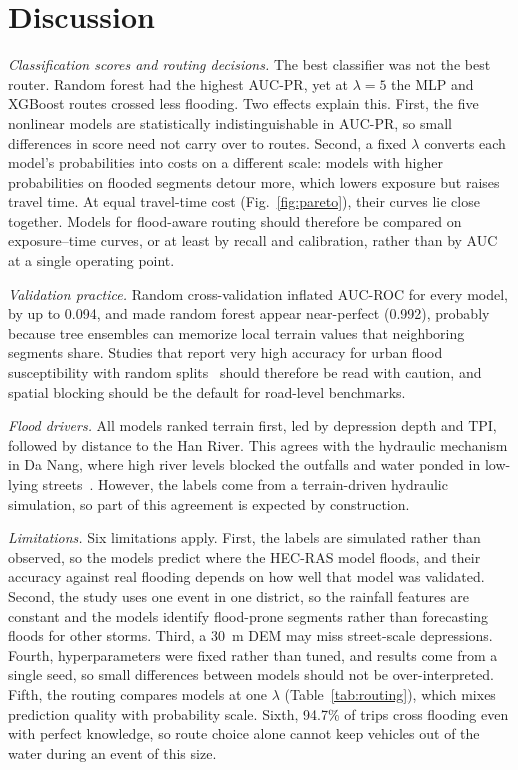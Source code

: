 \section{Discussion}
\label{sec:discussion}

\emph{Classification scores and routing decisions.} The best classifier was not the best router. Random forest had the highest AUC-PR, yet at $\lambda=5$ the MLP and XGBoost routes crossed less flooding. Two effects explain this. First, the five nonlinear models are statistically indistinguishable in AUC-PR, so small differences in score need not carry over to routes. Second, a fixed $\lambda$ converts each model's probabilities into costs on a different scale: models with higher probabilities on flooded segments detour more, which lowers exposure but raises travel time. At equal travel-time cost (Fig.~\ref{fig:pareto}), their curves lie close together. Models for flood-aware routing should therefore be compared on exposure--time curves, or at least by recall and calibration, rather than by AUC at a single operating point.

\emph{Validation practice.} Random cross-validation inflated AUC-ROC for every model, by up to 0.094, and made random forest appear near-perfect (0.992), probably because tree ensembles can memorize local terrain values that neighboring segments share. Studies that report very high accuracy for urban flood susceptibility with random splits~\cite{nguyen2026,hoang2025,yuan2023} should therefore be read with caution, and spatial blocking should be the default for road-level benchmarks.

\emph{Flood drivers.} All models ranked terrain first, led by depression depth and TPI, followed by distance to the Han River. This agrees with the hydraulic mechanism in Da Nang, where high river levels blocked the outfalls and water ponded in low-lying streets~\cite{doan2023}. However, the labels come from a terrain-driven hydraulic simulation, so part of this agreement is expected by construction.

\emph{Limitations.} Six limitations apply. First, the labels are simulated rather than observed, so the models predict where the HEC-RAS model floods, and their accuracy against real flooding depends on how well that model was validated. Second, the study uses one event in one district, so the rainfall features are constant and the models identify flood-prone segments rather than forecasting floods for other storms. Third, a 30~m DEM may miss street-scale depressions. Fourth, hyperparameters were fixed rather than tuned, and results come from a single seed, so small differences between models should not be over-interpreted. Fifth, the routing compares models at one $\lambda$ (Table~\ref{tab:routing}), which mixes prediction quality with probability scale. Sixth, 94.7\% of trips cross flooding even with perfect knowledge, so route choice alone cannot keep vehicles out of the water during an event of this size.
